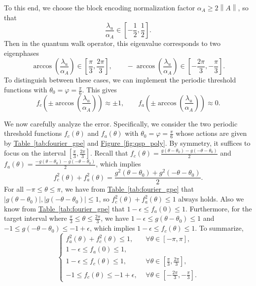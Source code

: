 \documentclass[letterpaper,onecolumn,11pt,accepted=2026-02-14]{quantumarticle}
\newcommand{\abs}[1]{\left\lvert#1\right\rvert}
\newcommand{\norm}[1]{\left\lVert#1\right\rVert}
\theoremstyle{remark}
\theoremstyle{plain}
\newcommand{\fig}[1]{\hyperref[fig:#1]{Figure~\ref*{fig:#1}}}
\newcommand{\tab}[1]{\hyperref[tab:#1]{Table~\ref*{tab:#1}}}
\begin{document}
To this end, we choose the block encoding normalization factor $\alpha_A\geq2\norm{A}$, so that
\begin{equation}
    \frac{\lambda_u}{\alpha_A}\in\left[-\frac{1}{2},\frac{1}{2}\right].
\end{equation}
Then in the quantum walk operator, this eigenvalue corresponds to two eigenphases
\begin{equation}
    \arccos\left(\frac{\lambda_u}{\alpha_A}\right)\in\left[\frac{\pi}{3},\frac{2\pi}{3}\right],\qquad
    -\arccos\left(\frac{\lambda_u}{\alpha_A}\right)\in\left[-\frac{2\pi}{3},-\frac{\pi}{3}\right].
\end{equation}
To distinguish between these cases, we can implement the periodic threshold functions with $\theta_0=\varphi=\frac{\pi}{6}$. This gives
\begin{equation}
    f_c\left(\pm\arccos\left(\frac{\lambda_u}{\alpha_A}\right)\right)\approx\pm1,\qquad
    f_a\left(\pm\arccos\left(\frac{\lambda_u}{\alpha_A}\right)\right)\approx0.
\end{equation}

We now carefully analyze the error. Specifically, we consider the two periodic threshold functions $f_c(\theta)$ and $f_a(\theta)$ with $\theta_0=\varphi=\frac{\pi}{6}$ whose actions are given by \tab{fourier_gpe} and \fig{qsp_poly}. By symmetry, it suffices to focus on the interval $\left[\frac{\pi}{3},\frac{2\pi}{3}\right]$. 
Recall that $f_c(\theta)=\frac{g(\theta-\theta_0)
    -g(-\theta-\theta_0)}{2}$ and $f_a(\theta)=\frac{-g(\theta-\theta_0)
    -g(-\theta-\theta_0)}{2}$, which implies
\begin{equation}
    f_c^2(\theta)+f_a^2(\theta)=\frac{g^2(\theta-\theta_0)+g^2(-\theta-\theta_0)}{2}.
\end{equation}
For all $-\pi\leq\theta\leq\pi$, we have from \tab{fourier_gpe} that $\abs{g(\theta-\theta_0)},\abs{g(-\theta-\theta_0)}\leq1$, so $f_c^2(\theta)+f_a^2(\theta)\leq1$ always holds. Also we know from \tab{fourier_gpe} that $1-\epsilon\leq f_a(0)\leq1$. Furthermore, for the target interval where $\frac{\pi}{3}\leq\theta\leq\frac{2\pi}{3}$, we have $1-\epsilon\leq g(\theta-\theta_0)\leq 1$ and $-1\leq g(-\theta-\theta_0)\leq-1+\epsilon$, which implies $1-\epsilon\leq f_c(\theta)\leq1$. To summarize,
\begin{equation}
\begin{cases}
    f_a^2(\theta)+f_c^2(\theta)\leq1,\quad &\forall \theta\in[-\pi,\pi],\\
    1-\epsilon\leq f_a(0)\leq1,\\
    1-\epsilon\leq f_c(\theta)\leq1,&\forall\theta\in\left[\frac{\pi}{3},\frac{2\pi}{3}\right],\\
    -1\leq f_c(\theta)\leq-1+\epsilon,&\forall\theta\in\left[-\frac{2\pi}{3},-\frac{\pi}{3}\right].
\end{cases}
\end{equation}
\end{document}

